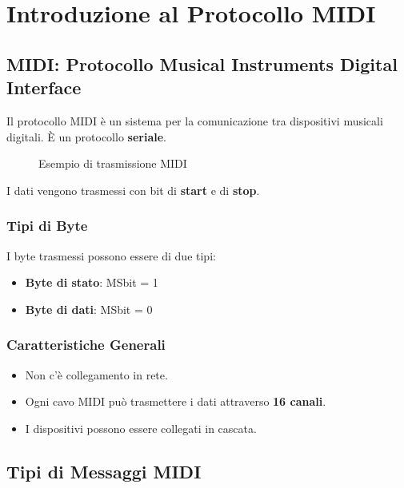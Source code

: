 \chapter{Introduzione al Protocollo MIDI}

\section{MIDI: Protocollo Musical Instruments Digital Interface}

Il protocollo MIDI è un sistema per la comunicazione tra dispositivi musicali digitali. È un protocollo \textbf{seriale}.

\begin{figure}[h!]
    \centering
    \caption{Esempio di trasmissione MIDI}
\end{figure}

I dati vengono trasmessi con bit di \textbf{start} e di \textbf{stop}.

\subsection*{Tipi di Byte}

I byte trasmessi possono essere di due tipi:

\begin{itemize}
    \item \textbf{Byte di stato}: MSbit = 1
    \item \textbf{Byte di dati}: MSbit = 0
\end{itemize}

\subsection*{Caratteristiche Generali}

\begin{itemize}
    \item Non c'è collegamento in rete.
    \item Ogni cavo MIDI può trasmettere i dati attraverso \textbf{16 canali}.
    \item I dispositivi possono essere collegati in cascata.
\end{itemize}

\section{Tipi di Messaggi MIDI}

